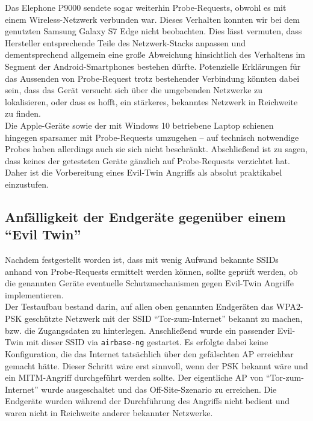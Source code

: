 Das Elephone P9000 sendete sogar weiterhin Probe-Requests, obwohl es mit einem Wireless-Netzwerk verbunden war. Dieses Verhalten konnten wir bei dem genutzten Samsung Galaxy S7 Edge nicht beobachten. Dies lässt vermuten, dass Hersteller entsprechende Teile des Netzwerk-Stacks anpassen und dementsprechend allgemein eine große Abweichung hinsichtlich des Verhaltens im Segment der Android-Smartphones bestehen dürfte.
Potenzielle Erklärungen für das Aussenden von Probe-Request trotz bestehender Verbindung könnten dabei sein, dass das Gerät versucht sich über die umgebenden Netzwerke zu lokalisieren, oder dass es hofft, ein stärkeres, bekanntes Netzwerk in Reichweite zu finden.\\

Die Apple-Geräte sowie der mit Windows 10 betriebene Laptop schienen hingegen sparsamer mit Probe-Requests umzugehen -- auf technisch notwendige Probes haben allerdings auch sie sich nicht beschränkt.
Abschließend ist zu sagen, dass keines der getesteten Geräte gänzlich auf Probe-Requests verzichtet hat.
Daher ist die Vorbereitung eines Evil-Twin Angriffs als absolut praktikabel einzustufen.

\subsection{Anfälligkeit der Endgeräte gegenüber einem \enquote{Evil Twin}}
Nachdem festgestellt worden ist, dass mit wenig Aufwand bekannte SSIDs anhand von Probe-Requests ermittelt werden können, sollte geprüft werden, ob die genannten Geräte eventuelle Schutzmechanismen gegen Evil-Twin Angriffe implementieren.\\

Der Testaufbau bestand darin, auf allen oben genannten Endgeräten das WPA2-PSK geschützte Netzwerk mit der SSID \enquote{Tor-zum-Internet} bekannt zu machen, bzw. die Zugangsdaten zu hinterlegen.
Anschließend wurde ein passender Evil-Twin mit dieser SSID via \texttt{airbase-ng} gestartet. Es erfolgte dabei keine Konfiguration, die das Internet tatsächlich über den gefälschten AP erreichbar gemacht hätte. Dieser Schritt wäre erst sinnvoll, wenn der PSK bekannt wäre und ein MITM-Angriff durchgeführt werden sollte. Der eigentliche AP von \enquote{Tor-zum-Internet} wurde ausgeschaltet und das Off-Site-Szenario zu erreichen.
Die Endgeräte wurden während der Durchführung des Angriffs nicht bedient und waren nicht in Reichweite anderer bekannter Netzwerke.

